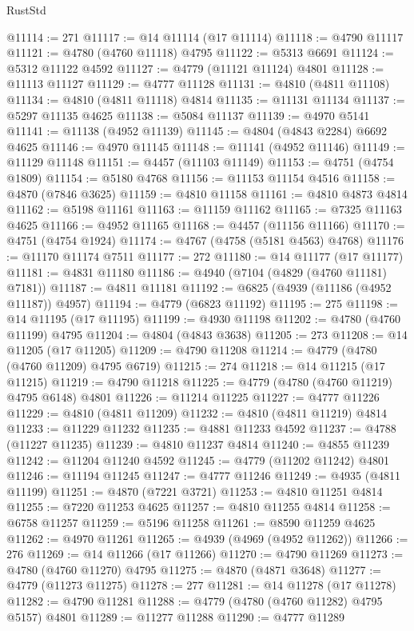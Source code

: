 \begin{lexlean}{RustStd}
\begin{coremodule}
@11114 := 271
@11117 := @14 @11114 (@17 @11114)
@11118 := @4790 @11117
@11121 := @4780 (@4760 @11118) @4795
@11122 := @5313 @6691
@11124 := @5312 @11122 @4592
@11127 := @4779 (@11121 @11124) @4801
@11128 := @11113 @11127
@11129 := @4777 @11128
@11131 := @4810 (@4811 @11108)
@11134 := @4810 (@4811 @11118) @4814
@11135 := @11131 @11134
@11137 := @5297 @11135 @4625
@11138 := @5084 @11137
@11139 := @4970 @5141
@11141 := @11138 (@4952 @11139)
@11145 := @4804 (@4843 @2284) @6692 @4625
@11146 := @4970 @11145
@11148 := @11141 (@4952 @11146)
@11149 := @11129 @11148
@11151 := @4457 (@11103 @11149)
@11153 := @4751 (@4754 @1809)
@11154 := @5180 @4768
@11156 := @11153 @11154 @4516
@11158 := @4870 (@7846 @3625)
@11159 := @4810 @11158
@11161 := @4810 @4873 @4814
@11162 := @5198 @11161
@11163 := @11159 @11162
@11165 := @7325 @11163 @4625
@11166 := @4952 @11165
@11168 := @4457 (@11156 @11166)
@11170 := @4751 (@4754 @1924)
@11174 := @4767 (@4758 (@5181 @4563) @4768)
@11176 := @11170 @11174 @7511
@11177 := 272
@11180 := @14 @11177 (@17 @11177)
@11181 := @4831 @11180
@11186 := @4940 (@7104 (@4829 (@4760 @11181) @7181))
@11187 := @4811 @11181
@11192 := @6825 (@4939 (@11186 (@4952 @11187)) @4957)
@11194 := @4779 (@6823 @11192)
@11195 := 275
@11198 := @14 @11195 (@17 @11195)
@11199 := @4930 @11198
@11202 := @4780 (@4760 @11199) @4795
@11204 := @4804 (@4843 @3638)
@11205 := 273
@11208 := @14 @11205 (@17 @11205)
@11209 := @4790 @11208
@11214 := @4779 (@4780 (@4760 @11209) @4795 @6719)
@11215 := 274
@11218 := @14 @11215 (@17 @11215)
@11219 := @4790 @11218
@11225 := @4779 (@4780 (@4760 @11219) @4795 @6148) @4801
@11226 := @11214 @11225
@11227 := @4777 @11226
@11229 := @4810 (@4811 @11209)
@11232 := @4810 (@4811 @11219) @4814
@11233 := @11229 @11232
@11235 := @4881 @11233 @4592
@11237 := @4788 (@11227 @11235)
@11239 := @4810 @11237 @4814
@11240 := @4855 @11239
@11242 := @11204 @11240 @4592
@11245 := @4779 (@11202 @11242) @4801
@11246 := @11194 @11245
@11247 := @4777 @11246
@11249 := @4935 (@4811 @11199)
@11251 := @4870 (@7221 @3721)
@11253 := @4810 @11251 @4814
@11255 := @7220 @11253 @4625
@11257 := @4810 @11255 @4814
@11258 := @6758 @11257
@11259 := @5196 @11258
@11261 := @8590 @11259 @4625
@11262 := @4970 @11261
@11265 := @4939 (@4969 (@4952 @11262))
@11266 := 276
@11269 := @14 @11266 (@17 @11266)
@11270 := @4790 @11269
@11273 := @4780 (@4760 @11270) @4795
@11275 := @4870 (@4871 @3648)
@11277 := @4779 (@11273 @11275)
@11278 := 277
@11281 := @14 @11278 (@17 @11278)
@11282 := @4790 @11281
@11288 := @4779 (@4780 (@4760 @11282) @4795 @5157) @4801
@11289 := @11277 @11288
@11290 := @4777 @11289

\end{coremodule}
\end{lexlean}

